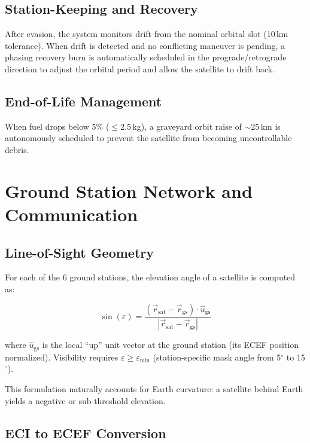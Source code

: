 \documentclass[11pt, a4paper]{article}
\begin{document}
\subsection{Station-Keeping and Recovery}

After evasion, the system monitors drift from the nominal orbital slot (10\,km tolerance). When drift is detected and no conflicting maneuver is pending, a phasing recovery burn is automatically scheduled in the prograde/retrograde direction to adjust the orbital period and allow the satellite to drift back.

\subsection{End-of-Life Management}

When fuel drops below 5\% ($\leq 2.5$\,kg), a graveyard orbit raise of $\sim$25\,km is autonomously scheduled to prevent the satellite from becoming uncontrollable debris.

\section{Ground Station Network and Communication}

\subsection{Line-of-Sight Geometry}

For each of the 6 ground stations, the elevation angle of a satellite is computed as:

\begin{equation}
  \sin(\varepsilon) = \frac{(\vec{r}_\text{sat} - \vec{r}_\text{gs}) \cdot \hat{u}_\text{gs}}{|\vec{r}_\text{sat} - \vec{r}_\text{gs}|}
\end{equation}

where $\hat{u}_\text{gs}$ is the local ``up'' unit vector at the ground station (its ECEF position normalized). Visibility requires $\varepsilon \geq \varepsilon_\text{min}$ (station-specific mask angle from 5$^\circ$ to 15$^\circ$).

This formulation naturally accounts for Earth curvature: a satellite behind Earth yields a negative or sub-threshold elevation.

\subsection{ECI to ECEF Conversion}
\end{document}
